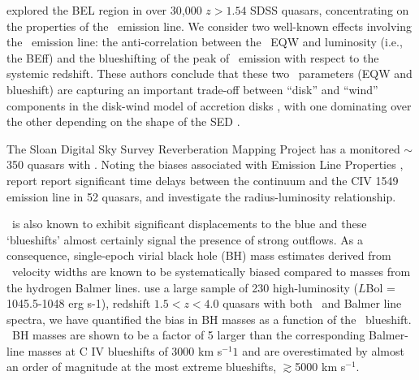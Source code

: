 \documentclass[a4paper,fleqn,usenatbib]{mnras}
\begin{document}
\citet{Richards2011} explored the BEL region in over 30,000 $z > 1.54$ SDSS
quasars, concentrating on the properties of the \civ\ emission
line. We consider two well-known effects involving the \civ\ emission
line: the anti-correlation between the \civ\ EQW and luminosity (i.e.,
the BEff) and the blueshifting of the peak of \civ\ emission with
respect to the systemic redshift. These authors conclude that these
two \civ\ parameters (EQW and blueshift) are capturing an important
trade-off between ``disk'' and ``wind'' components in the disk-wind
model of accretion disks \citep[e.g.,][]{Murray1995, Elvis2000,
Proga2000}, with one dominating over the other depending on the shape
of the SED \citep[][strong \civ\ EQW indicates a more ionizing SED and
large \civ\ blueshift indicating a less ionizing SED ]{Leighly2004b}.



The Sloan Digital Sky Survey Reverberation Mapping Project
\cite[SDSS-RM; ][]{Shen2015} has a monitored $\sim$350 quasars with
\civ. Noting the biases associated with \civ Emission Line Properties
\citep[e.g. increasing systematic offsets with decreasing
signal-to-noise][]{Denney2016}, \citet{Grier2019} report report
significant time delays between the continuum and the CIV 1549
emission line in 52 quasars, and investigate the \civ
radius-luminosity relationship.

\civ\ is also known to exhibit significant displacements to the
blue and these `blueshifts' almost certainly signal the presence of
strong outflows. As a consequence, single-epoch virial black hole (BH)
mass estimates derived from \civ\ velocity widths are known to be
systematically biased compared to masses from the hydrogen Balmer
lines. \citet{Coatman2017} use a large sample of 230 high-luminosity
($L$Bol = 1045.5-1048 erg s-1), redshift $1.5 < z < 4.0$ quasars with
both \civ\ and Balmer line spectra, we have quantified the bias in \civ
BH masses as a function of the \civ\ blueshift. \civ\ BH masses are
shown to be a factor of 5 larger than the corresponding Balmer-line
masses at C IV blueshifts of 3000 km s$^{-1}1$ and are overestimated
by almost an order of magnitude at the most extreme blueshifts,
$\gtrsim$5000 km s$^{-1}$.
\end{document}
